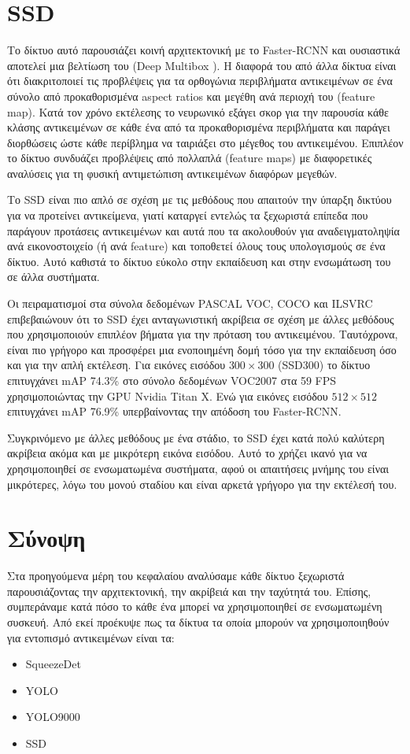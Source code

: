 \section{SSD \cite{26}}
Το δίκτυο αυτό παρουσιάζει κοινή αρχιτεκτονική με το Faster-RCNN και ουσιαστικά αποτελεί μια βελτίωση του (Deep Multibox \cite{27}). Η διαφορά του από άλλα δίκτυα είναι ότι διακριτοποιεί τις προβλέψεις για τα ορθογώνια περιβλήματα αντικειμένων σε ένα σύνολο από προκαθορισμένα aspect ratios και μεγέθη ανά περιοχή του (feature map). Κατά τον χρόνο εκτέλεσης το νευρωνικό εξάγει σκορ για την παρουσία κάθε κλάσης αντικειμένων σε κάθε ένα από τα προκαθορισμένα περιβλήματα και παράγει διορθώσεις ώστε κάθε περίβλημα να ταιριάξει στο μέγεθος του αντικειμένου. Επιπλέον το δίκτυο συνδυάζει προβλέψεις από πολλαπλά (feature maps) με διαφορετικές αναλύσεις για τη φυσική αντιμετώπιση αντικειμένων διαφόρων μεγεθών.

Το SSD είναι πιο απλό σε σχέση με τις μεθόδους που απαιτούν την ύπαρξη δικτύου για να προτείνει αντικείμενα, γιατί καταργεί εντελώς τα ξεχωριστά επίπεδα που παράγουν προτάσεις αντικειμένων και αυτά που τα ακολουθούν για αναδειγματοληψία ανά εικονοστοιχείο (ή ανά feature) και τοποθετεί όλους τους υπολογισμούς σε ένα δίκτυο. Αυτό καθιστά το δίκτυο εύκολο στην εκπαίδευση και στην ενσωμάτωση του σε άλλα συστήματα.

Οι πειραματισμοί στα σύνολα δεδομένων PASCAL VOC, COCO και ILSVRC επιβεβαιώνουν ότι το SSD έχει ανταγωνιστική ακρίβεια σε σχέση με άλλες μεθόδους που χρησιμοποιούν επιπλέον βήματα για την πρόταση του αντικειμένου. Ταυτόχρονα, είναι πιο γρήγορο και προσφέρει μια ενοποιημένη δομή τόσο για την εκπαίδευση όσο και για την απλή εκτέλεση. Για εικόνες εισόδου $ 300 \times 300 $ (SSD300) το δίκτυο επιτυγχάνει mAP 74.3\% στο σύνολο δεδομένων VOC2007 στα 59 FPS χρησιμοποιώντας την GPU Nvidia Titan X. Ενώ για εικόνες εισόδου $ 512 \times 512 $ επιτυγχάνει mAP 76.9\% υπερβαίνοντας την απόδοση του Faster-RCNN. 

Συγκρινόμενο με άλλες μεθόδους με ένα στάδιο, το SSD έχει κατά πολύ καλύτερη ακρίβεια ακόμα και με μικρότερη εικόνα εισόδου. Αυτό το χρήζει ικανό για να χρησιμοποιηθεί σε ενσωματωμένα συστήματα, αφού οι απαιτήσεις μνήμης του είναι μικρότερες, λόγω του μονού σταδίου και είναι αρκετά γρήγορο για την εκτέλεσή του. 

\section{Σύνοψη}
Στα προηγούμενα μέρη του κεφαλαίου αναλύσαμε κάθε δίκτυο ξεχωριστά παρουσιάζοντας την αρχιτεκτονική, την ακρίβειά και την ταχύτητά του. Επίσης, συμπεράναμε κατά πόσο το κάθε ένα μπορεί να χρησιμοποιηθεί σε ενσωματωμένη συσκευή. Από εκεί προέκυψε πως τα δίκτυα τα οποία μπορούν να χρησιμοποιηθούν για εντοπισμό αντικειμένων είναι τα:
\begin{itemize}
    \item SqueezeDet
    \item YOLO
    \item YOLO9000
    \item SSD
\end{itemize}

